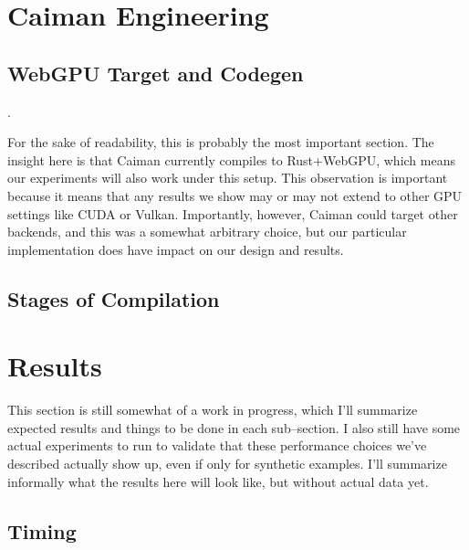 \section{Caiman Engineering}
\label{sec:engineering}


\subsection{WebGPU Target and Codegen}

.

For the sake of readability, this is probably the most important section.  The insight here is that Caiman currently compiles to Rust+WebGPU, which means our experiments will also work under this setup.  This observation is important because it means that any results we show may or may not extend to other GPU settings like CUDA or Vulkan.  Importantly, however, Caiman could target other backends, and this was a somewhat arbitrary choice, but our particular implementation does have impact on our design and results.

\subsection{Stages of Compilation}
\label{subsec:compilation}


\section{Results}
\label{sec:results}

This section is still somewhat of a work in progress, which I'll summarize expected results and things to be done in each sub--section.  I also still have some actual experiments to run to validate that these performance choices we've described actually show up, even if only for synthetic examples.  I'll summarize informally what the results here will look like, but without actual data yet.

\subsection{Timing}

